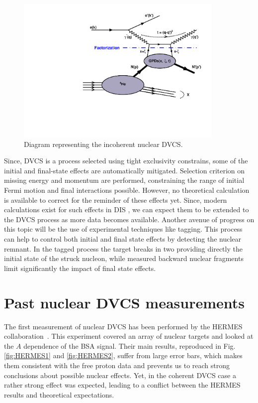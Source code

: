 \documentclass{article}
\begin{document}
\begin{figure}[tbp!]
\center
\includegraphics[width=10cm]{fig3/handbag_incoherent.pdf}
\caption{Diagram representing the incoherent nuclear DVCS.}
\label{fig:InCohDiag}
\end{figure}

Since, DVCS is a 
process selected using tight exclusivity constrains, some of the initial and final-state effects are
automatically mitigated. Selection criterion on missing energy and momentum are performed,
constraining the range of initial Fermi motion and final interactions possible. However, no theoretical
calculation is available to correct for the reminder of these effects yet. Since, modern calculations exist 
for such effects in DIS \cite{Cosyn:2017ekf}, we can expect them to be extended to the DVCS 
process as more data becomes available. Another avenue of progress
on this topic will be the use of experimental techniques like tagging. This process
can help to control both initial and final state effects by detecting the nuclear remnant.
In the tagged process the target breaks in two providing directly the initial state
of the struck nucleon, while measured backward nuclear fragments limit significantly the
impact of final state effects.

\section{Past nuclear DVCS measurements}

The first measurement of nuclear DVCS has been performed by the HERMES 
collaboration~\cite{Airapetian:2009cga}. This experiment covered an array of 
nuclear targets and looked at the $A$ dependence of the
BSA signal. Their main results, reproduced in Fig. \ref{fig:HERMES1} and \ref{fig:HERMES2}, suffer
from large error bars, which makes them consistent with the free proton data and prevents us to
reach strong conclusions about possible nuclear effects. Yet, in the coherent DVCS case a rather
strong effect was expected, leading to a conflict between the HERMES results and theoretical
expectations. 
\end{document}
